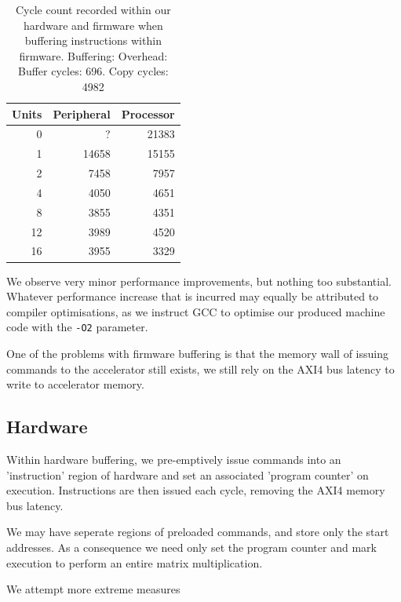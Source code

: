 \documentclass[a4paper,8pt]{report}
\begin{document}
\begin{table}
  \centering
  \begin{tabular}{r|rr}
    \toprule
    Units & Peripheral & Processor\\
    \midrule
    0&?&21383 \\
    1&14658&15155 \\
    2&7458& 7957 \\
    4&4050& 4651 \\
    8&3855& 4351 \\
    12&3989& 4520 \\
    16&3955& 3329 \\
    \bottomrule
  \end{tabular}
  \caption{Cycle count recorded within our hardware and firmware when buffering
    instructions within firmware. Buffering: Overhead: Buffer cycles: 696. Copy cycles: 4982}
\end{table}

We observe very minor performance improvements, but nothing too substantial.
Whatever performance increase that is incurred may equally be attributed to
compiler optimisations, as we instruct GCC to optimise our produced machine
code with the \texttt{-O2} parameter. 

One of the problems with firmware buffering is that the memory wall of issuing
commands to the accelerator still exists, we still rely on the AXI4 bus latency
to write to accelerator memory.

\subsection{Hardware}
Within hardware buffering, we pre-emptively issue commands into an 'instruction'
region of hardware and set an associated 'program counter' on execution.
Instructions are then issued each cycle, removing the AXI4 memory bus latency.

We may have seperate regions of preloaded commands, and store only the start
addresses. As a consequence we need only set the program counter and mark
execution to perform an entire matrix multiplication.






We attempt more extreme measures
\end{document}
